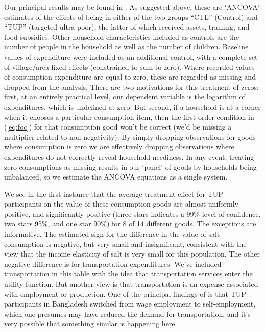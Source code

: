 \documentclass[11pt]{article}
\newcommand{\Eq}[1]{(\ref{eq:#1})}
\begin{document}
Our principal results may be found in .  As
suggested above, these are `ANCOVA' estimates of the effects of being
in either of the two groups ``CTL'' (Control) and ``TUP'' (targeted
ultra-poor), the latter of which received assets, training, and food
subsidies.  Other household characteristics included as controls
are the number of people in the household as well as the number of
children.  Baseline values of expenditure were included as an
additional control, with a complete set of village/area fixed effects
(constrained to sum to zero).  Where recorded values of consumption
expenditure are equal to zero, these are regarded as missing and
dropped from the analysis.  There are two motivations for this
treatment of zeros: first, at an entirely practical level, our
dependent variable is the logarithm of expenditures, which is
undefined at zero.  But second, if a household is at a corner when it
chooses a particular consumption item, then the first order condition
in \Eq{foc} for that consumption good won't be correct (we'd be
missing a multiplier related to non-negativity).  By simply dropping
observations for goods where consumption is zero we are effectively
dropping observations where expenditures do not correctly reveal
household neediness.  In any event, treating zero consumptions as
missing results in our `panel' of goods by households being
unbalanced, so we estimate the ANCOVA equations as a single system.

We see in the first instance that the average treatment effect for TUP
participants on the value of these consumption goods are almost
uniformly positive, and significantly positive (three stars indicates
a 99\% level of confidence, two stars 95\%, and one star 90\%) for 8 of
14 different goods.  The exceptions are informative.  The estimated
sign for the difference in the value of salt consumption is negative,
but very small and insignificant, consistent with the view that the
income elasticity of salt is very small for this population.  The
other negative difference is for transportation expenditures.  We've
included transportation in this table with the idea that
transportation services enter the utility function.  But another view
is that transportation is an expense associated with employment or
production.  One of the principal findings of \cite{bandiera-etal12}
is that TUP participants in Bangladesh switched from wage employment
to self-employment, which one presumes may have reduced the demand for
transportation, and it's very possible that something similar is
happening here.
\end{document}
